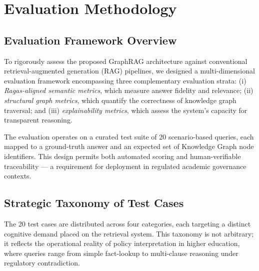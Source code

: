 %

\section{Evaluation Methodology}
\label{sec:methodology}

\subsection{Evaluation Framework Overview}

To rigorously assess the proposed GraphRAG architecture against conventional retrieval-augmented generation (RAG) pipelines, we designed a multi-dimensional evaluation framework encompassing three complementary evaluation strata:
(i) \textit{Ragas-aligned semantic metrics}, which measure answer fidelity and relevance;
(ii) \textit{structural graph metrics}, which quantify the correctness of knowledge graph traversal; and
(iii) \textit{explainability metrics}, which assess the system's capacity for transparent reasoning.

The evaluation operates on a curated test suite of 20 scenario-based queries, each mapped to a ground-truth answer and an expected set of Knowledge Graph node identifiers. This design permits both automated scoring and human-verifiable traceability — a requirement for deployment in regulated academic governance contexts.

\subsection{Strategic Taxonomy of Test Cases}
\label{sec:taxonomy}

The 20 test cases are distributed across four categories, each targeting a distinct cognitive demand placed on the retrieval system. This taxonomy is not arbitrary; it reflects the operational reality of policy interpretation in higher education, where queries range from simple fact-lookup to multi-clause reasoning under regulatory contradiction.

